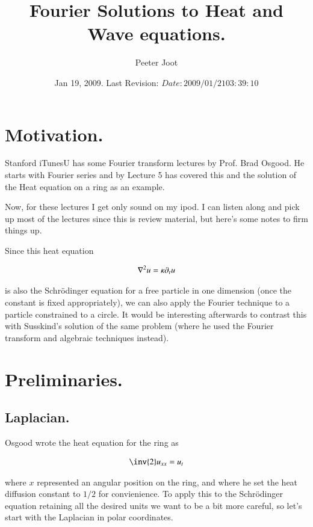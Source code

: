\documentclass{article}
\title{ Fourier Solutions to Heat and Wave equations. }
\author{Peeter Joot}
\date{ Jan 19, 2009.  Last Revision: $Date: 2009/01/21 03:39:10 $ }
\begin{document}
\maketitle{}


\section{ Motivation. }

Stanford iTunesU has some Fourier transform lectures by Prof. Brad Osgood.
He starts with Fourier series and by Lecture 5 has covered this and
the solution of the Heat equation on a ring as an example.

Now, for these lectures I get only sound on my ipod.  I can listen along and
pick up most of the lectures since this is review material, but here's some
notes to firm things up.

Since this heat equation

\begin{align}
\nabla^2 u = \kappa \partial_t u
\end{align}

is also the Schr\"{o}dinger equation for a free particle in one 
dimension (once the 
constant is fixed appropriately), we can also apply the Fourier
technique to a particle
constrained to a circle.  It would be interesting afterwards to 
contrast this with Susskind's solution of the
same problem (where he used the Fourier transform and algebraic techniques
instead).

\section{ Preliminaries. }

\subsection{ Laplacian. }

Osgood wrote the heat equation for the ring as

\begin{align*}
\inv{2} u_{xx} = u_t
\end{align*}

where $x$ represented an angular position on the ring, and where
he set the heat diffusion constant to $1/2$ for convienience.
To apply this to the Schr\"{o}dinger equation retaining all the desired
units we want to be a bit more careful, so let's start with the Laplacian
in polar coordinates.
\end{document}

